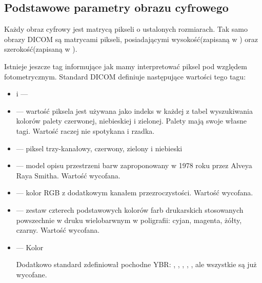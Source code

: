 \subsection{Podstawowe parametry obrazu cyfrowego}

\dicomtagExplanations

\par
Każdy obraz cyfrowy jest matrycą pikseli o ustalonych rozmiarach.
Tak samo obrazy DICOM są matrycami pikseli, posiadającymi wysokość(zapisaną w ) oraz szerokość(zapisaną w ).

\par
Istnieje jeszcze tag  informujące jak mamy interpretować piksel pod względem fotometrycznym.
Standard DICOM definiuje następujące wartości tego tagu:
\begin{itemize}
    \item {} i  ---

    \item {} --- wartość piksela jest używana jako indeks w każdej z tabel wyszukiwania kolorów palety czerwonej, niebieskiej i zielonej.
          Palety mają swoje własne tagi.
          Wartość raczej nie spotykana i rzadka.

    \item {} --- piksel trzy-kanałowy, czerwony, zielony i niebieski

    \item {}  --- model opisu przestrzeni barw zaproponowany w 1978 roku przez Alveya Raya Smitha.
          Wartość wycofana.

    \item {} --- kolor RGB z dodatkowym kanałem przezroczystości.
          Wartość wycofana.

    \item {} --- zestaw czterech podstawowych kolorów farb drukarskich stosowanych powszechnie w druku wielobarwnym w poligrafii: cyjan, magenta, żółty, czarny.
          Wartość wycofana.

    \item {} --- Kolor

          Dodatkowo standard zdefiniował pochodne YBR: , , , , , ale wszystkie są już wycofane.
\end{itemize}

